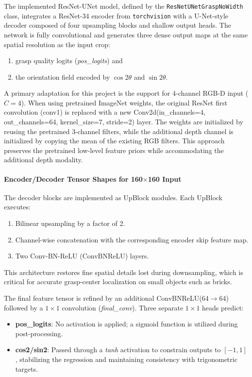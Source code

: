 The implemented ResNet-UNet model, defined by the \texttt{ResNetUNetGraspNoWidth} class, integrates a ResNet-34 encoder from \texttt{torchvision} with a U-Net-style decoder composed of four upsampling blocks and shallow output heads. The network is fully convolutional and generates three dense output maps at the same spatial resolution as the input crop: 
\begin{enumerate}
    \item[(i)] grasp quality logits (\textit{pos\_logits}) and 
    \item[(ii)] the orientation field encoded by $\cos 2\theta$ and $\sin 2\theta$.
\end{enumerate}

A primary adaptation for this project is the support for 4-channel RGB-D input ($C=4$). When using pretrained ImageNet weights, the original ResNet first convolution (conv1) is replaced with a new Conv2d(in\_channels=4, out\_channels=64, kernel\_size=7, stride=2) layer. The weights are initialized by reusing the pretrained 3-channel filters, while the additional depth channel is initialized by copying the mean of the existing RGB filters. This approach preserves the pretrained low-level feature priors while accommodating the additional depth modality.

\paragraph{Encoder/Decoder Tensor Shapes for 160$\times$160 Input}
The decoder blocks are implemented as UpBlock modules. Each UpBlock executes:
\begin{enumerate}
    \item Bilinear upsampling by a factor of 2.
    \item Channel-wise concatenation with the corresponding encoder skip feature map.
    \item Two Conv-BN-ReLU (ConvBNReLU) layers.
\end{enumerate}
This architecture restores fine spatial details lost during downsampling, which is critical for accurate grasp-center localization on small objects such as bricks.

The final feature tensor is refined by an additional ConvBNReLU(64$\to$64) followed by a $1\times1$ convolution (\textit{final\_conv}). Three separate $1\times1$ heads predict:
\begin{itemize}
    \item \textbf{pos\_logits}: No activation is applied; a sigmoid function is utilized during post-processing.
    \item \textbf{cos2/sin2}: Passed through a \textit{tanh} activation to constrain outputs to $[-1, 1]$, stabilizing the regression and maintaining consistency with trigonometric targets.
\end{itemize}

